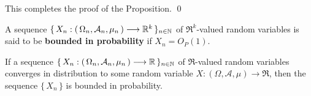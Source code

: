 \vskip 0.3cm
\noindent
This completes the proof of the Proposition.
\qed

\begin{definition}
\mbox{}\vskip 0.1cm
\noindent
A sequence $\{\,X_{n} : \left(\,\Omega_{n},\mathcal{A}_{n},\mu_{n}\,\right) \longrightarrow \mathbb{R}^{k}\,\}_{n \in \mathbb{N}}$
of $\Re^{k}$-valued random variables is said to be \textbf{bounded in probability} if $X_{n} = O_{P}(1)$.
\end{definition}

\begin{theorem}\mbox{}\vskip 0.1cm
\noindent
If a sequence $\{\,X_{n} : \left(\,\Omega_{n},\mathcal{A}_{n},\mu_{n}\,\right) \longrightarrow \mathbb{R}\,\}_{n \in \mathbb{N}}$
of $\Re$-valued random variables converges in distribution to some random variable
$X : (\Omega,\mathcal{A},\mu) \longrightarrow \Re$,
then the sequence $\{\,X_{n}\,\}$ is bounded in probability.
\end{theorem}

